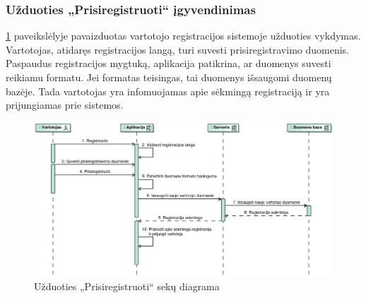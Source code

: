 \documentclass[12pt]{article}
\begin{document}
	\pagebreak
	
	\subsubsection{Užduoties „Prisiregistruoti“ įgyvendinimas}
	
	\ref{RegisterSeq} paveikslėlyje pavaizduotas vartotojo registracijos sistemoje užduoties vykdymas. Vartotojas, atidaręs registracijos langą, turi suvesti prisiregistravimo duomenis. Paspaudus registracijos mygtuką, aplikacija patikrina, ar duomenys suvesti reikiamu formatu. Jei formatas teisingas, tai duomenys išsaugomi duomenų bazėje. Tada vartotojas yra infomuojamas apie sėkmingą registraciją ir yra prijungiamas prie sistemos.	
	
	\begin{figure}[h]
		\begin{center}
			\includegraphics[width=\textwidth]{Prisiregistruoti.eps}
			\caption{Užduoties „Prisiregistruoti“ sekų diagrama\label{RegisterSeq}}
		\end{center}
	\end{figure}
	
	\pagebreak
	
\end{document}
